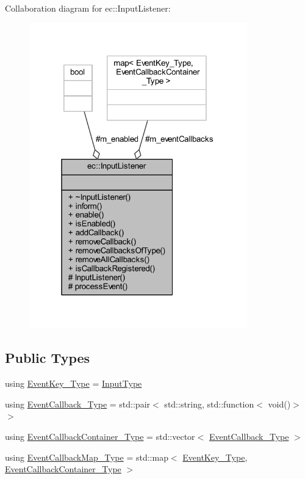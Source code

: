 Collaboration diagram for ec\+:\+:Input\+Listener\+:\nopagebreak
\begin{figure}[H]
\begin{center}
\leavevmode
\includegraphics[width=268pt]{classec_1_1_input_listener__coll__graph}
\end{center}
\end{figure}
\subsection*{Public Types}
\begin{DoxyCompactItemize}
\item 
using \mbox{\hyperlink{classec_1_1_input_listener_af5dfb691564fa8e05fcf7f053e3c532b}{Event\+Key\+\_\+\+Type}} = \mbox{\hyperlink{namespaceec_ae2d697393ea83b34b18ab14eb5dacbca}{Input\+Type}}
\item 
using \mbox{\hyperlink{classec_1_1_input_listener_acc8376886aac460c21a980c411cc1d15}{Event\+Callback\+\_\+\+Type}} = std\+::pair$<$ std\+::string, std\+::function$<$ void()$>$ $>$
\item 
using \mbox{\hyperlink{classec_1_1_input_listener_a0d9334fafd46399a39448fe00fad3c2e}{Event\+Callback\+Container\+\_\+\+Type}} = std\+::vector$<$ \mbox{\hyperlink{classec_1_1_input_listener_acc8376886aac460c21a980c411cc1d15}{Event\+Callback\+\_\+\+Type}} $>$
\item 
using \mbox{\hyperlink{classec_1_1_input_listener_a74ebbc0d4a31fcda8b6cda624e5ecdd1}{Event\+Callback\+Map\+\_\+\+Type}} = std\+::map$<$ \mbox{\hyperlink{classec_1_1_input_listener_af5dfb691564fa8e05fcf7f053e3c532b}{Event\+Key\+\_\+\+Type}}, \mbox{\hyperlink{classec_1_1_input_listener_a0d9334fafd46399a39448fe00fad3c2e}{Event\+Callback\+Container\+\_\+\+Type}} $>$
\end{DoxyCompactItemize}
